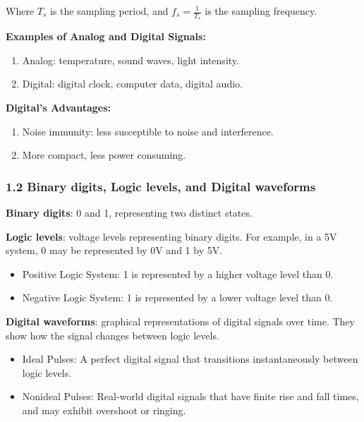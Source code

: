 \documentclass[
  a4paper,
]{article}
\providecommand{\tightlist}{%
  \setlength{\itemsep}{0pt}\setlength{\parskip}{0pt}}
\begin{document}
Where \(T_s\) is the sampling period, and \(f_s = \frac{1}{T_s}\) is the
sampling frequency.

\textbf{Examples of Analog and Digital Signals:}

\begin{enumerate}
\def\labelenumi{\arabic{enumi}.}
\tightlist
\item
  Analog: temperature, sound waves, light intensity.
\item
  Digital: digital clock, computer data, digital audio.
\end{enumerate}

\textbf{Digital's Advantages:}

\begin{enumerate}
\def\labelenumi{\arabic{enumi}.}
\tightlist
\item
  Noise immunity: less susceptible to noise and interference.
\item
  More compact, less power consuming.
\end{enumerate}

\subsubsection{1.2 Binary digits, Logic levels, and Digital
waveforms}\label{binary-digits-logic-levels-and-digital-waveforms}

\textbf{Binary digits}: 0 and 1, representing two distinct states.

\textbf{Logic levels}: voltage levels representing binary digits. For
example, in a 5V system, 0 may be represented by 0V and 1 by 5V.

\begin{itemize}
\tightlist
\item
  Positive Logic System: 1 is represented by a higher voltage level than
  0.
\item
  Negative Logic System: 1 is represented by a lower voltage level than
  0.
\end{itemize}

\textbf{Digital waveforms}: graphical representations of digital signals
over time. They show how the signal changes between logic levels.

\begin{itemize}
\tightlist
\item
  Ideal Pulses: A perfect digital signal that transitions
  instantaneously between logic levels.
\item
  Nonideal Pulses: Real-world digital signals that have finite rise and
  fall times, and may exhibit overshoot or ringing.
\end{itemize}
\end{document}
